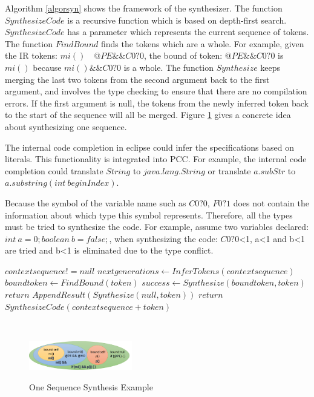 \documentclass{sig-alternate-05-2015}
\begin{document}

Algorithm \ref{algorsyn} shows the framework of the synthesizer. The function $SynthesizeCode$ is a recursive function which is based on depth-first search. $SynthesizeCode$ has a parameter which represents the current sequence of tokens. The function $FindBound$ finds the tokens which are a whole. For example, given the IR tokens: $mi()\quad @PE\&\&C0?0$, the bound of token: $@PE\&\&C0?0$ is $mi()$ because $mi()\&\&C0?0$ is a whole. The function $Synthesize$ keeps merging the last two tokens from the second argument back to the first argument, and involves the type checking to ensure that there are no compilation errors. If the first argument is null, the tokens from the newly inferred token back to the start of the sequence will all be merged. Figure \ref{synthesizerexample} gives a concrete idea about synthesizing one sequence.

The internal code completion in eclipse could infer the specifications based on literals. This functionality is integrated into PCC. For example, the internal code completion could translate $String$ to $java.lang.String$ or translate $a.subStr$ to $a.substring(int\ beginIndex)$.

 Because the symbol of the variable name such as $C0?0$, $F0?1$ does not contain the information about which type this symbol represents. Therefore, all the types must be tried to synthesize the code. For example, assume two variables declared: $int\ a = 0;boolean\ b = false;$, when synthesizing the code: $C0?0$<1, a<1 and b<1 are tried and b<1 is eliminated due to the type conflict.
\vspace{-0.5cm}
\\\begin {algorithm}
\caption {$SynthesizeCode(contextsequence)$}
\label{algorsyn}
\begin {algorithmic}
\REQUIRE $contextsequence != null$
\STATE $nextgenerations\leftarrow InferTokens(contextsequence)$
\STATE $boundtoken\leftarrow FindBound(token)$
\STATE $success\leftarrow Synthesize(boundtoken, token)$
\STATE $return$
\ENDIF
{}
\STATE $AppendResult(Synthesize(null, token))$
\STATE $return$
\ENDIF
\STATE $SynthesizeCode(contextsequence + token)$
\ENDFOR
\end {algorithmic}
\end {algorithm}
\vspace{-0.25cm}
\\\begin{figure}
  \centering
  \includegraphics[width=0.4\textwidth]{pics/synthesizeexample.png}\\
  \caption{One Sequence Synthesis Example}\label{synthesizerexample}
\end{figure}
\vspace{-0.4cm}
\end{document}

